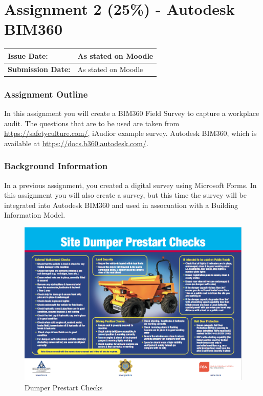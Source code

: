 
	
\part*{Assignment 2 (25\%) - Autodesk BIM360}

\begin{tabularx}{\textwidth}{ |X|X| }
	\hline
	\textbf{Issue Date:} & As stated on Moodle \\
	\hline 
	\textbf{Submission Date:}  & As stated on Moodle  \\
	\hline
\end{tabularx}


\section*{Assignment Outline}


In this assignment you will create a BIM360 Field Survey to capture a workplace audit.  The questions that are to be used are taken from \href{https://safetyculture.com/}{https://safetyculture.com/}, iAudior example survey.   Autodesk BIM360, which is available at \href{https://docs.b360.autodesk.com/}{https://docs.b360.autodesk.com/}.


\section*{Background Information}

In a previous assignment, you created a digital survey using Microsoft Forms.  In this assignment you will also create a survey, but this time the survey will be integrated into Autodesk BIM360 and used in assocuation with a Building Information Model.


\begin{figure}
	\centering
	\includegraphics[width=1.0\linewidth]{img/DumperPrestart.png}
	\caption{Dumper Prestart Checks}
	\label{fig:DumperPrestartChecks}
\end{figure}

